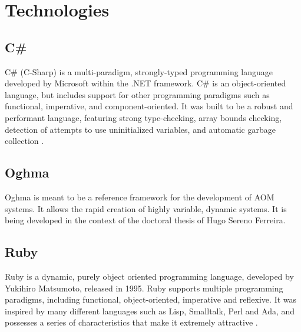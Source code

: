 \chapter{Technologies}\label{chap:technologies}

\section{C\#}\label{sec:csharp}

C\# (C-Sharp) is a multi-paradigm, strongly-typed programming language developed by Microsoft within the .NET framework. C\# is an object-oriented language, but includes support for other programming paradigms such as functional, imperative, and component-oriented. It was built to be a robust and performant language, featuring strong type-checking, array bounds checking, detection of attempts to use uninitialized variables, and automatic garbage collection \cite{csharp}.

\section{Oghma}\label{sec:oghma}


Oghma is meant to be a reference framework for the development of AOM systems. It allows the rapid creation of highly variable, dynamic systems. It is being developed in the context of the doctoral thesis of Hugo Sereno Ferreira.


\section{Ruby}\label{sec:technologies:ruby}

Ruby is a dynamic, purely object oriented programming language, developed by Yukihiro Matsumoto, released in 1995. Ruby supports multiple programming paradigms, including functional, object-oriented, imperative and reflexive. It was inspired by many different languages such as Lisp, Smalltalk, Perl and Ada, and possesses a series of characteristics that make it extremely attractive \cite{ruby}.



